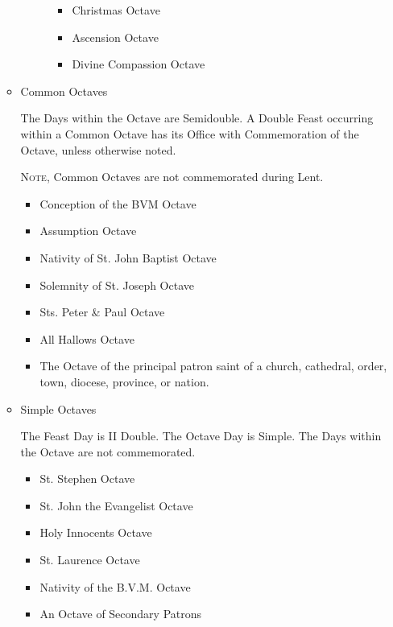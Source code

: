 \begin{itemize}
\begin{itemize}
\begin{description}
                        \begin{itemize}
                            \item Christmas Octave
                            \item Ascension Octave
                            \item Divine Compassion Octave
                        \end{itemize}
                \end{description}
            \item Common Octaves\par
            The Days within the Octave are Semidouble. A Double Feast occurring within a Common Octave has its Office with Commemoration of the Octave, unless otherwise noted.\par
            \textsc{Note,} Common Octaves are not commemorated during Lent.
                \begin{itemize}
                    \item Conception of the BVM Octave
                    \item Assumption Octave
                    \item Nativity of St. John Baptist Octave
                    \item Solemnity of St. Joseph Octave
                    \item Sts. Peter \& Paul Octave
                    \item All Hallows Octave
                    \item The Octave of the principal patron saint of a church, cathedral, order, town, diocese, province, or nation. 
                \end{itemize}
            \item Simple Octaves\par
            The Feast Day is II Double. The Octave Day is Simple. The Days within the Octave are not commemorated.
                \begin{itemize}
                    \item St. Stephen Octave
                    \item St. John the Evangelist Octave
                    \item Holy Innocents Octave
                    \item St. Laurence Octave
                    \item Nativity of the B.V.M. Octave
                    \item An Octave of Secondary Patrons

\end{itemize}
\end{itemize}
\end{itemize}
